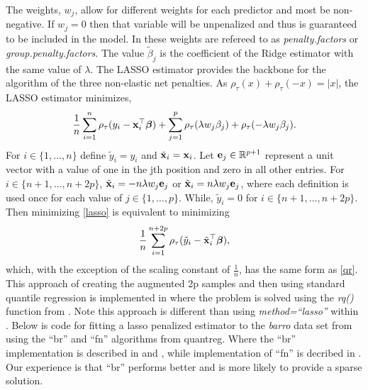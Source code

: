 \documentclass[article]{rqPenVignette}%
\newcommand{\ve}{{\bf e}}
\newcommand{\vx}{{\bf x}}
\newcommand{\vbeta}{\mbox{\boldmath $\beta$}}
\newcommand{\Real}{\mathbb{R}}
\begin{document}
The weights, $w_j$, allow for different weights for each predictor and most be non-negative. If $w_j=0$ then that variable will be unpenalized and thus is guaranteed to be included in the model. In  these weights are refereed to as \emph{penalty.factors} or \emph{group.penalty.factors}. The value $\tilde{\beta}_j$ is the coefficient of the Ridge estimator with the same value of $\lambda$. The LASSO estimator provides the backbone for the algorithm of the three non-elastic net penalties. As $\rho_\tau(x)+\rho_\tau(-x) = |x|$, the LASSO estimator minimizes,
\begin{equation}
\label{lasso}
\frac{1}{n} \sum_{i=1}^n \rho_\tau(y_i - \vx_i^\top\vbeta) +  \sum_{j=1}^p \rho_\tau(\lambda w_j\beta_j)+\rho_\tau(-\lambda w_j\beta_j).
\end{equation}
For $i \in \{1,\ldots,n\}$ define $\tilde{y}_i = y_i$ and $\tilde{\vx}_i = \vx_i$. Let $\ve_j \in \Real^{p+1}$ represent a unit vector with a value of one in the jth position and zero in all other entries. For $i \in \{n+1,\ldots,n+2p\}$, $\tilde{\vx}_i = -n\lambda w_j \ve_j$ or $\tilde{\vx}_i = n\lambda w_j \ve_j$, where each definition is used once for each value of $j \in \{1,\ldots,p\}$. While, $\tilde{y}_i = 0$ for $i \in \{n+1,\ldots,n+2p\}$. Then minimizing \eqref{lasso} is equivalent to minimizing 
\begin{equation}
\label{lassoAlt}
\frac{1}{n} \sum_{i=1}^{n+2p} \rho_\tau(\tilde{y}_i-\tilde{\vx}_i^\top\vbeta),
\end{equation}
which, with the exception of the scaling constant of $\frac{1}{n}$, has the same form as \eqref{qr}. This approach of creating the augmented 2p samples and then using standard quantile regression is implemented in  where the problem is solved using the \emph{rq()} function from . Note this approach is different than using \emph{method=``lasso''} within . Below is code for fitting a lasso penalized estimator to the \emph{barro} data set from  using the ``br'' and ``fn'' algorithms from quantreg. Where the ``br'' implementation is described in \citet{crq1} and \citet{crq2}, while implementation of ``fn'' is decribed in \citet{portnoy1997}. Our experience is that ``br'' performs better and is more likely to provide a sparse solution.

\begin{Schunk}
\end{Schunk}
\end{document}
